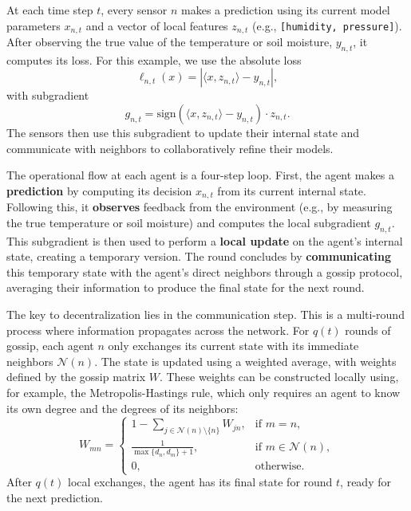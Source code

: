 \documentclass[journal]{IEEEtran}
\begin{document}
At each time step $t$, every sensor $n$ makes a prediction using its current model parameters $x_{n,t}$ and a vector of local features $z_{n,t}$ (e.g., \texttt{[humidity, pressure]}).
After observing the true value of the temperature or soil moisture, $y_{n,t}$, it computes its loss.
For this example, we use the absolute loss
\begin{equation}
    \ell_{n,t}(x) = | \langle x, z_{n,t} \rangle - y_{n,t} |,\label{eq:absolute_loss}
\end{equation}
with subgradient
\begin{equation}
    g_{n,t} = \text{sign}(\langle x, z_{n,t} \rangle - y_{n,t}) \cdot z_{n,t}.\label{eq:absolute_subgradient}
\end{equation}
The sensors then use this subgradient to update their internal state and communicate with neighbors to collaboratively refine their models.

The operational flow at each agent is a four-step loop.
First, the agent makes a \textbf{prediction} by computing its decision $x_{n,t}$ from its current internal state.
Following this, it \textbf{observes} feedback from the environment (e.g., by measuring the true temperature or soil moisture) and computes the local subgradient $g_{n,t}$.
This subgradient is then used to perform a \textbf{local update} on the agent's internal state, creating a temporary version.
The round concludes by \textbf{communicating} this temporary state with the agent's direct neighbors through a gossip protocol, averaging their information to produce the final state for the next round.

The key to decentralization lies in the communication step.
This is a multi-round process where information propagates across the network.
For $q(t)$ rounds of gossip, each agent $n$ only exchanges its current state with its immediate neighbors $\mathcal{N}(n)$.
The state is updated using a weighted average, with weights defined by the gossip matrix $W$.
These weights can be constructed locally using, for example, the Metropolis-Hastings rule, which only requires an agent to know its own degree and the degrees of its neighbors:
\begin{equation}\label{eq:Metropolis-Hastings}
    W_{mn} = \begin{cases}
        1 - \sum_{j \in \mathcal{N}(n) \setminus \{n\}} W_{jn}, & \text{if } m = n,                \\
        \frac{1}{\max\{d_n, d_m\} + 1},                         & \text{if } m \in \mathcal{N}(n), \\
        0,                                                      & \text{otherwise}.
    \end{cases}
\end{equation}
After $q(t)$ local exchanges, the agent has its final state for round $t$, ready for the next prediction.
\end{document}
